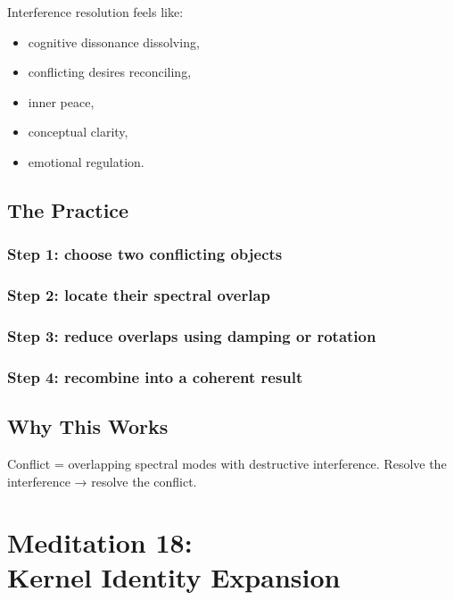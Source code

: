 \documentclass[12pt]{article}
\begin{document}
Interference resolution feels like:

\begin{itemize}
    \item cognitive dissonance dissolving,
    \item conflicting desires reconciling,
    \item inner peace,
    \item conceptual clarity,
    \item emotional regulation.
\end{itemize}

\section{The Practice}

\subsection*{Step 1: choose two conflicting objects}

\subsection*{Step 2: locate their spectral overlap}

\subsection*{Step 3: reduce overlaps using damping or rotation}

\subsection*{Step 4: recombine into a coherent result}

\section{Why This Works}

Conflict = overlapping spectral modes with destructive interference.  
Resolve the interference → resolve the conflict.

\newpage


\chapter{Meditation 18:\\ Kernel Identity Expansion}
\end{document}
